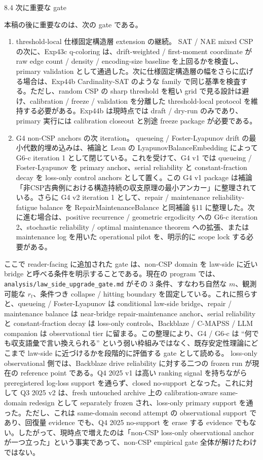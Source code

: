 \documentclass[12pt,a4paper]{article}
\begin{document}
8.4 次に重要な gate

本稿の後に重要なのは、次の gate である。

\begin{enumerate}
\def\labelenumi{\arabic{enumi}.}
\item
  threshold-local 仕様固定構造層 extension の継続。 SAT / NAE mixed CSP の次に、Exp43c q-coloring は、drift-weighted / first-moment coordinate が raw edge count / density / encoding-size baseline を上回るかを検査し、primary validation として通過した。次に仕様固定構造層の幅をさらに広げる場合は、Exp44b Cardinality-SAT のような family で同じ基準を検査する。ただし、random CSP の sharp threshold を粗い grid で見る設計は避け、calibration / freeze / validation を分離した threshold-local protocol を維持する必要がある。Exp44b は現時点では draft / dry-run のみであり、primary 実行には calibration closeout と別途 freeze package が必要である。
\item
  G4 non-CSP anchors の次 iteration。 queueing / Foster-Lyapunov drift の最小代数的埋め込みは、補論と Lean の LyapunovBalanceEmbedding によって G6-c iteration 1 として閉じている。これを受けて、G4 v1 では queueing / Foster-Lyapunov を primary anchor、serial reliability と constant-fraction decay を loss-only control anchors として置く。この G4 v1 package は補論「非CSP古典例における構造持続の収支原理の最小アンカー」に整理されている。さらに G4 v2 iteration 1 として、repair / maintenance reliability-fatigue balance を RepairMaintenanceBalance と同補論 §11 に整理した。次に進む場合は、positive recurrence / geometric ergodicity への G6-c iteration 2、stochastic reliability / optimal maintenance theorem への拡張、または maintenance log を用いた operational pilot を、明示的に scope lock する必要がある。
\end{enumerate}

ここで reader-facing に追加された gate は、non-CSP domain を law-side に近い bridge と呼べる条件を明示することである。現在の program では、\texttt{analysis/law\_side\_upgrade\_gate.md} がその 3 条件、すなわち自然な \(m\)、観測可能な \(r_{t}\)、条件つき collapse / hitting boundary を固定している。これに照らすと、queueing / Foster-Lyapunov は conditional law-side bridge、repair / maintenance balance は near-bridge repair-maintenance anchor、serial reliability と constant-fraction decay は loss-only controls、Backblaze / C-MAPSS / LLM companion は observational tier に留まる。この整理により、G4 / G6-c は ``何でも収支語彙で言い換えられる'' という弱い枠組みではなく、既存安定性理論にどこまで law-side に近づけるかを段階的に評価する gate として読める。 loss-only observational 側では、Backblaze drive reliability に対する二つの frozen run が現在の reference point である。Q4 2025 v1 は高い ranking signal を持ちながら preregistered log-loss support を通らず、closed no-support となった。これに対して Q3 2025 v2 は、fresh untouched archive 上の calibration-aware same-domain redesign として separately frozen され、loss-only primary support を通った。ただし、これは same-domain second attempt の observational support であり、回復量 evidence でも、Q4 2025 no-support を erase する evidence でもない。したがって、現時点で増えたのは「non-CSP loss-only observational anchor が一つ立った」という事実であって、non-CSP empirical gate 全体が解けたわけではない。
\end{document}
